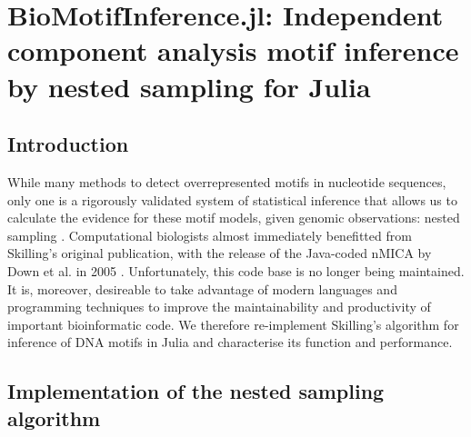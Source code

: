 \chapter{BioMotifInference.jl: Independent component analysis motif inference by nested sampling for Julia}
\section{Introduction}
While many methods to detect overrepresented motifs in nucleotide sequences, only one is a rigorously validated system of statistical inference that allows us to calculate the evidence for these motif models, given genomic observations: nested sampling \cite{Skilling2006}. Computational biologists almost immediately benefitted from Skilling's original publication, with the release of the Java-coded nMICA by Down et al. in 2005 \cite{Down2005}. Unfortunately, this code base is no longer being maintained. It is, moreover, desireable to take advantage of modern languages and programming techniques to improve the maintainability and productivity of important bioinformatic code. We therefore re-implement Skilling's algorithm for inference of DNA motifs in Julia \cite{Bezanson2015} and characterise its function and performance.

\section{Implementation of the nested sampling algorithm}



